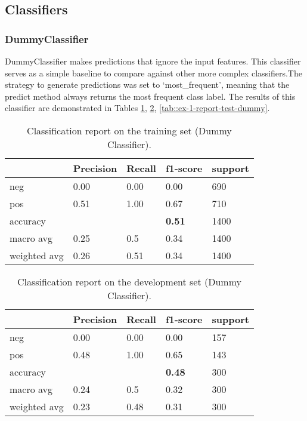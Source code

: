 \documentclass[10pt, a4paper]{article}
\begin{document}
	
	\subsection{Classifiers}
	\subsubsection{DummyClassifier}
	DummyClassifier makes predictions that ignore the input features. This classifier serves as a simple baseline to compare against other more complex classifiers.The strategy to generate predictions was set to ‘most\_frequent’,  meaning that the predict method always returns the most frequent class label. The results of this classifier are demonstrated in Tables  \ref{tab::ex-1-report-train-dummy}, \ref{tab::ex-1-report-dev-dummy}, \ref{tab::ex-1-report-test-dummy}.
	
	\begin{table}
		\begin{tabular}{|l|l|l|l|l|}
			\hline
			\cellcolor{blue!25}\textbf{} & \cellcolor{blue!25}\textbf{Precision} &
			\cellcolor{blue!25}\textbf{Recall}  &
			\cellcolor{blue!25}\textbf{f1-score}  &
			\cellcolor{blue!25}\textbf{support}\\
			\hline
			neg & 0.00 & 0.00 & 0.00 & 690 \\\hline
			pos & 0.51  & 1.00 & 0.67 & 710 \\\hline
			accuracy & & & \textbf{0.51} & 1400 \\\hline
			macro avg & 0.25 & 0.5 & 0.34 & 1400 \\\hline
			weighted avg & 0.26 & 0.51 & 0.34 & 1400 \\\hline
			
		\end{tabular}
		\centering
		\caption{Classification report on the training set (Dummy Classifier).}
		\label{tab::ex-1-report-train-dummy}
	\end{table}
	

 	\begin{table}
		\begin{tabular}{|l|l|l|l|l|}
			\hline
			\cellcolor{blue!25}\textbf{} & \cellcolor{blue!25}\textbf{Precision} &
			\cellcolor{blue!25}\textbf{Recall}  &
			\cellcolor{blue!25}\textbf{f1-score}  &
			\cellcolor{blue!25}\textbf{support}\\
			\hline
			neg & 0.00 & 0.00 & 0.00 & 157 \\\hline
			pos & 0.48  & 1.00 & 0.65 & 143 \\\hline
			accuracy & & & \textbf{0.48} & 300 \\\hline
			macro avg & 0.24 & 0.5 & 0.32 & 300 \\\hline
			weighted avg & 0.23 & 0.48 & 0.31 & 300 \\\hline
			
		\end{tabular}
		\centering
		\caption{Classification report on the development set (Dummy Classifier).}
		\label{tab::ex-1-report-dev-dummy}
	\end{table}
	
\end{document}

